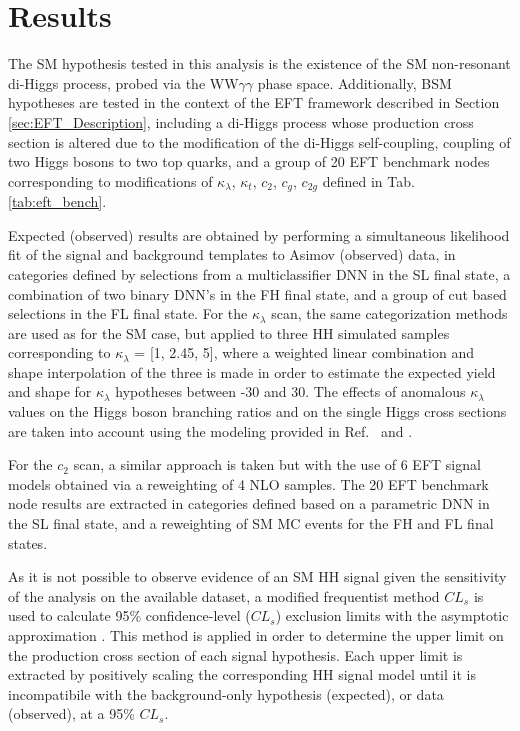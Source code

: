 \section{Results} \label{sec:results}

The SM hypothesis tested in this analysis is the existence of the SM non-resonant di-Higgs process, probed via the WW$\gamma\gamma$ phase space. Additionally, BSM hypotheses are tested in the context of the 
EFT framework described in Section \ref{sec:EFT_Description}, including a di-Higgs process whose production cross section is altered due to the modification 
of the di-Higgs self-coupling, coupling of two Higgs bosons to two top quarks, and a group of 20 EFT benchmark nodes corresponding to modifications 
of $\kappa_{\lambda}$, $\kappa_{t}$, $c_{2}$, $c_{g}$, $c_{2g}$ defined in Tab. \ref{tab:eft_bench}. 

Expected (observed) results are obtained by performing a simultaneous likelihood fit of the signal and 
background templates to Asimov (observed) data, in categories defined by selections from a multiclassifier DNN in the SL final state, a combination 
of two binary DNN's in the FH final state, and a group of cut based selections in the FL final state. For the $\kappa_{\lambda}$ scan, the same categorization methods are used as for the 
SM case, but applied to three HH simulated samples corresponding to $\kappa_{\lambda}$ = [1, 2.45, 5], where a weighted linear combination and shape interpolation of the three is made in order to estimate 
the expected yield and shape for $\kappa_{\lambda}$ hypotheses between -30 and 30. The effects of anomalous $\kappa_{\lambda}$ values on the Higgs boson branching ratios and on the single Higgs cross sections are taken into account using the modeling provided in Ref.~\cite{Degrassi:2016wml} and \cite{Maltoni:2017ims}.

For the $c_{2}$ scan, a similar approach is taken but with the use of 6 EFT signal models obtained via a reweighting of 4 NLO samples. 
The 20 EFT benchmark node results are extracted in categories defined based on a parametric DNN in the SL final state, and a reweighting of SM MC events for the FH and FL final states.  

As it is not possible to observe evidence of an SM HH signal given the sensitivity of the analysis on the available dataset, a modified frequentist method $CL_s$ \cite{CLS1, CLS2} is used to 
calculate 95\% confidence-level ($CL_{s}$) exclusion limits with the asymptotic approximation \cite{Cowan:2010js}. This method is applied in order to determine the upper limit 
on the production cross section of each signal hypothesis. Each upper limit is extracted by positively scaling the corresponding 
HH signal model until it is incompatibile with the background-only hypothesis (expected), or data (observed), at a 95\% $CL_{s}$.   

